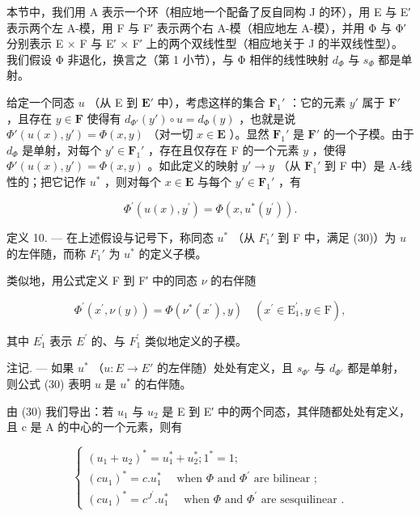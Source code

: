 本节中，我们用 A 表示一个环（相应地一个配备了反自同构 J 的环），用 E 与 E′ 表示两个左 A-模，用 F 与 F′ 表示两个右 A-模（相应地左 A-模），并用 Φ 与 Φ′ 分别表示 E × F 与 E′ × F′ 上的两个双线性型（相应地关于 J 的半双线性型）。我们假设 Φ 非退化，换言之（第 1 小节），与 Φ 相伴的线性映射 \(d_{\Phi}\) 与 \(s_{\Phi}\) 都是单射。

给定一个同态 \(u\) （从 E 到 \(\mathbf{E}'\) 中），考虑这样的集合 \(\mathbf{F}_{1}'\) ：它的元素 \(y'\) 属于 \(\mathbf{F}'\) ，且存在 \(y \in \mathbf{F}\) 使得有 \(d_{\Phi'}(y') \circ u = d_{\Phi}(y)\) ，也就是说 \(\Phi'(u(x), y') = \Phi(x, y)\) （对一切 \(x \in \mathbf{E}\) ）。显然 \(\mathbf{F}_{1}'\) 是 \(\mathbf{F}'\) 的一个子模。由于 \(d_{\Phi}\) 是单射，对每个 \(y' \in \mathbf{F}_{1}'\) ，存在且仅存在 F 的一个元素 \(y\) ，使得 \(\Phi'(u(x), y') = \Phi(x, y)\) 。如此定义的映射 \(y' \to y\) （从 \(\mathbf{F}_{1}'\) 到 F 中）是 A-线性的；把它记作 \(u^{*}\) ，则对每个 \(x \in \mathbf{E}\) 与每个 \(y' \in \mathbf{F}_{1}'\) ，有

\[
\Phi^ {\prime} (u (x), y ^ {\prime}) = \Phi (x, u ^ {*} (y ^ {\prime})).\tag{30}
\]

定义 10. --- 在上述假设与记号下，称同态 \(u^*\) （从 \(F_1'\) 到 F 中，满足 (30)）为 \(u\) 的左伴随，而称 \(F_1'\) 为 \(u^*\) 的定义子模。

类似地，用公式定义 F 到 F′ 中的同态 \(\nu\) 的右伴随

\[
\Phi^ {\prime} (x ^ {\prime}, \nu (y)) = \Phi (\nu^ {*} (x ^ {\prime}), y) \quad (x ^ {\prime} \in \mathrm{E} _ {1} ^ {\prime}, y \in \mathrm{F}),\tag{31}
\]

其中 \(E_{1}^{\prime}\) 表示 \(E^{\prime}\) 的、与 \(F_{1}^{\prime}\) 类似地定义的子模。

注记. --- 如果 \(u^{*}\) （\(u: E \to E'\) 的左伴随）处处有定义，且 \(s_{\Phi'}\) 与 \(d_{\Phi'}\) 都是单射，则公式 (30) 表明 \(u\) 是 \(u^{*}\) 的右伴随。

由 (30) 我们导出：若 \(u_1\) 与 \(u_2\) 是 E 到 E′ 中的两个同态，其伴随都处处有定义，且 c 是 A 的中心的一个元素，则有

\[
\left\{ \begin{array}{l} (u _ {1} + u _ {2}) ^ {*} = u _ {1} ^ {*} + u _ {2} ^ {*}; 1 ^ {*} = 1; \\ (c u _ {1}) ^ {*} = c. u _ {1} ^ {*} \quad \text { when } \Phi \text { and } \Phi^ {\prime} \text { are bilinear }; \\ (c u _ {1}) ^ {*} = c ^ {J ^ {\prime}}. u _ {1} ^ {*} \quad \text { when } \Phi \text { and } \Phi^ {\prime} \text { are sesquilinear }. \end{array} \right.\tag{32}
\]

